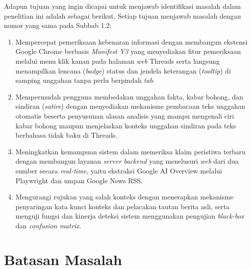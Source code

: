 \documentclass[12pt,a4paper,twoside]{report}
\begin{document}
Adapun tujuan yang ingin dicapai untuk menjawab identifikasi masalah dalam penelitian ini adalah sebagai berikut. Setiap tujuan menjawab masalah dengan nomor yang sama pada Subbab 1.2:
\begin{enumerate}[leftmargin=0.8cm,itemsep=3pt,topsep=2pt]
  \item Mempercepat pemeriksaan kebenaran informasi dengan membangun ekstensi Google Chrome berbasis \textit{Manifest V3} yang menyediakan fitur pemeriksaan melalui menu klik kanan pada halaman \textit{web} Threads serta langsung menampilkan lencana (\textit{badge}) status dan jendela keterangan (\textit{tooltip}) di samping unggahan tanpa perlu berpindah \textit{tab}.
  \item Mempermudah pengguna membedakan unggahan fakta, kabar bohong, dan sindiran (\textit{satire}) dengan menyediakan mekanisme pembacaan teks unggahan otomatis beserta penyusunan alasan analisis yang mampu mengenali ciri kabar bohong maupun menjelaskan konteks unggahan sindiran pada teks berbahasa tidak baku di Threads.
  \item Meningkatkan kemampuan sistem dalam memeriksa klaim peristiwa terbaru dengan membangun layanan \textit{server} \textit{backend} yang menelusuri \textit{web} dari dua sumber secara \textit{real-time}, yaitu ekstraksi Google AI Overview melalui Playwright dan umpan Google News RSS.
  \item Mengurangi rujukan yang salah konteks dengan menerapkan mekanisme penyaringan kata kunci konteks dan pelacakan tautan berita asli, serta menguji fungsi dan kinerja deteksi sistem menggunakan pengujian \textit{black-box} dan \textit{confusion matrix}.
\end{enumerate}

\section{Batasan Masalah}
\end{document}

